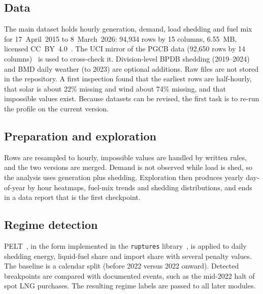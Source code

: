 \documentclass[10pt,a4paper]{article}
\begin{document}
\subsection{Data}
The main dataset holds hourly generation, demand, load shedding and fuel mix for 17~April~2015 to 8~March~2026: 94{,}934 rows by 15 columns, 6.55~MB, licensed CC~BY~4.0~\cite{pgcb_mendeley}. The UCI mirror of the PGCB data (92{,}650 rows by 14 columns)~\cite{pgcb_uci} is used to cross-check it. Division-level BPDB shedding (2019--2024) and BMD daily weather (to 2023) are optional additions. Raw files are not stored in the repository. A first inspection found that the earliest rows are half-hourly, that solar is about 22\% missing and wind about 74\% missing, and that impossible values exist. Because datasets can be revised, the first task is to re-run the profile on the current version.

\subsection{Preparation and exploration}
Rows are resampled to hourly, impossible values are handled by written rules, and the two versions are merged. Demand is not observed while load is shed, so the analysis uses generation plus shedding. Exploration then produces yearly day-of-year by hour heatmaps, fuel-mix trends and shedding distributions, and ends in a data report that is the first checkpoint.

\subsection{Regime detection}
PELT~\cite{killick2012}, in the form implemented in the \texttt{ruptures} library~\cite{truong2020}, is applied to daily shedding energy, liquid-fuel share and import share with several penalty values. The baseline is a calendar split (before 2022 versus 2022 onward). Detected breakpoints are compared with documented events, such as the mid-2022 halt of spot LNG purchases. The resulting regime labels are passed to all later modules.
\end{document}
